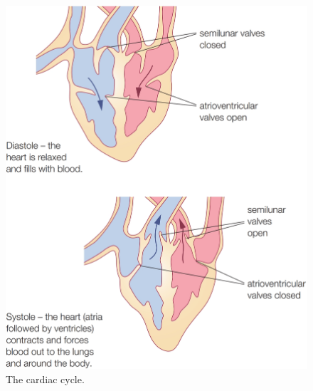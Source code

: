 \begin{itemize}
\begin{figure}[H]
        \includegraphics[scale=0.15]{Biology/1B/Images/1B-4-2.png}
        \caption{The cardiac cycle.}
    \end{figure}
\end{itemize}